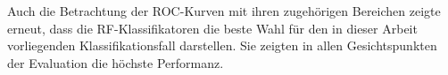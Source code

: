 Auch die Betrachtung der ROC-Kurven mit ihren zugehörigen Bereichen zeigte erneut, dass die RF-Klassifikatoren die beste Wahl für den in dieser Arbeit vorliegenden Klassifikationsfall darstellen. Sie zeigten in allen Gesichtspunkten der Evaluation die höchste Performanz.

\begin{figure}[t]
  \centering
  \qquad

\end{figure}
